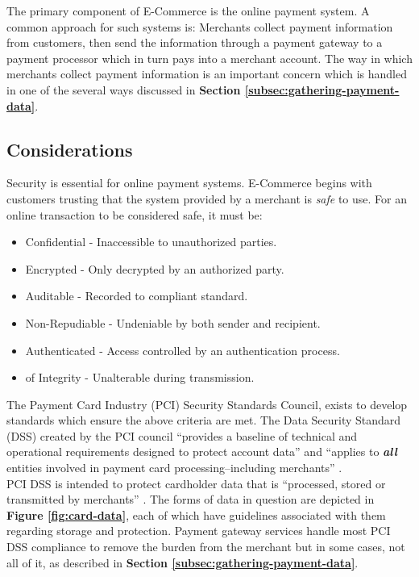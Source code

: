 The primary component of E-Commerce is the online payment system. A common approach for such systems is: Merchants collect payment information from customers, then send the information through a payment gateway to a payment processor which in turn pays into a merchant account. The way in which merchants collect payment information is an important concern which is handled in one of the several ways discussed in \textbf{Section \ref{subsec:gathering-payment-data}}.

\subsection{Considerations}
\label{subsec:considerations}

Security is essential for online payment systems. E-Commerce begins with customers trusting that the system provided by a merchant is \textit{safe} to use. For an online transaction to be considered safe, it must be:

\begin{itemize}
	  \item Confidential - Inaccessible to unauthorized parties.
    \item Encrypted - Only decrypted by an authorized party.
    \item Auditable - Recorded to compliant standard.
    \item Non-Repudiable - Undeniable by both sender and recipient.
    \item Authenticated - Access controlled by an authentication process.
    \item of Integrity - Unalterable during transmission.
\end{itemize}

The Payment Card Industry (PCI) Security Standards Council, exists to develop standards which ensure the above criteria are met. The Data Security Standard (DSS) created by the PCI council ``provides a baseline of technical and operational requirements designed to protect account data'' and ``applies to \textit{\textbf{all}} entities involved in payment card processing--including merchants'' \cite{PCI-DSS}.\\

PCI DSS is intended to protect cardholder data that is ``processed, stored or transmitted by merchants'' \cite{PCI-DSS}. The forms of data in question are depicted in \textbf{Figure \ref{fig:card-data}}, each of which have guidelines associated with them regarding storage and protection. Payment gateway services handle most PCI DSS compliance to remove the burden from the merchant but in some cases, not all of it, as described in \textbf{Section \ref{subsec:gathering-payment-data}}.

